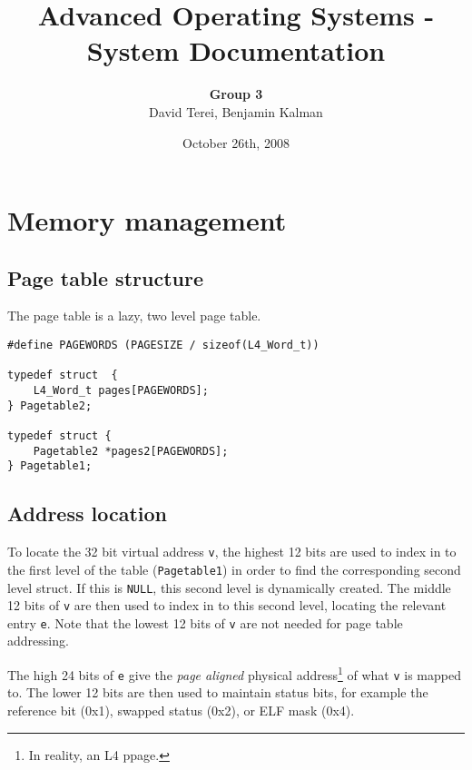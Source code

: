 \documentclass[12pt,english]{article}
\begin{document}

\title{Advanced Operating Systems - System Documentation}
\author{\textbf{Group 3} \\ David Terei, Benjamin Kalman}
\date{October 26th, 2008}
\maketitle

\tableofcontents{}


\newpage{}
\section{Memory management}

\subsection{Page table structure}

The page table is a lazy, two level page table.  

\begin{verbatim}
#define PAGEWORDS (PAGESIZE / sizeof(L4_Word_t))

typedef struct  {
    L4_Word_t pages[PAGEWORDS];
} Pagetable2;

typedef struct {
    Pagetable2 *pages2[PAGEWORDS];
} Pagetable1;
\end{verbatim}

\subsection{Address location}

To locate the 32 bit virtual address \texttt{v}, the highest 12 bits are used to index in to the first level of the table (\texttt{Pagetable1}) in order to find the corresponding second level struct.  If this is \texttt{NULL}, this second level is dynamically created.  The middle 12 bits of \texttt{v} are then used to index in to this second level, locating the relevant entry \texttt{e}.  Note that the lowest 12 bits of \texttt{v} are not needed for page table addressing.

The high 24 bits of \texttt{e} give the \emph{page aligned} physical address\footnote{In reality, an L4 ppage.} of what \texttt{v} is mapped to.  The lower 12 bits are then used to maintain status bits, for example the reference bit (0x1), swapped status (0x2), or ELF mask (0x4).
\end{document}
